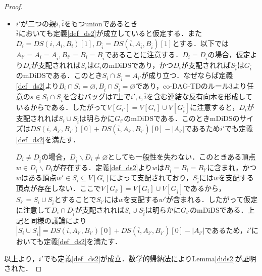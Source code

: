 \documentclass[master]{kuisthesis}		%
\def\|{\verb|}
\theoremstyle{plain}
\theoremstyle{definition}
\begin{document}
\begin{proof}
\begin{itemize}
        \item $i'$が二つの親$i, \overline{i}$をもつunionであるとき \\
        $\overline{i}$においても定義\ref{def_ds2}が成立していると仮定する．また$D_i = DS(i, A_i, B_i)[1], D_{\overline{i}} = DS(\overline{i}, A_{\overline{i}}, B_{\overline{i}})[1]$とする．以下では$A_{i'} = A_{i} = A_{\overline{i}}, B_{i'} = B_{i} = B_{\overline{i}}$であることに注意する．$D_i = D_{\overline{i}}$の場合，仮定より$D_i$が支配されれば$S_i$は$G_i$のmDiDSであり，かつ$D_i$が支配されれば$S_{\overline{i}}$は$G_{\overline{i}}$のmDiDSである．このとき$S_{i} \cap S_{\overline{i}} = A_{i'}$が成り立つ．なぜならば定義\ref{def_ds2}より$B_{i} \cap S_i = \varnothing, B_{\overline{i}} \cap S_{\overline{i}} = \varnothing$であり，co-DAG-TDのルール3より任意の$s \in S_{i} \cap S_{\overline{i}}$を含むバッグは$T$上で$i', i, \overline{i}$を含む連結な反有向木を形成しているからである．したがって$V[G_{i'}] = V[G_i] \cup V[G_{\overline{i}}]$に注意すると，$D_i$が支配されれば$S_i \cup S_{\overline{i}}$は明らかに$G_{i'}$のmDiDSである．このときmDiDSのサイズは$DS(i, A_{i'}, B_{i'})[0] + DS(\overline{i}, A_{i'}, B_{i'})[0] - |A_{i'}|$であるため$i'$でも定義\ref{def_ds2}を満たす．

        $D_i \neq D_{\overline{i}}$の場合，$D_{\overline{i}} \backslash D_i \neq \varnothing$としても一般性を失わない．このときある頂点$w \in D_{\overline{i}} \backslash D_i$が存在する．定義\ref{def_ds2}より$w$は$B_{\overline{i}} = B_{i} = B_{i'}$に含まれ，かつ$w$はある頂点$w' \in S_i\subseteq V[G_i]$によって支配されており，$S_{\overline{i}}$には$w$を支配する頂点が存在しない．ここで$V[G_{i'}] = V[G_i] \cup V[G_{\overline{i}}]$であるから，$S_{i'} = S_i \cup S_{\overline{i}}$とすることで$S_{i'}$には$w$を支配する$w'$が含まれる．したがって仮定に注意して$D_i \cap D_{\overline{i}}$が支配されれば$S_i \cup S_{\overline{i}}$は明らかに$G_{i'}$のmDiDSである．上記と同様の議論により$|S_i \cup S_{\overline{i}}| = DS(i, A_{i'}, B_{i'})[0] + DS(\overline{i}, A_{i'}, B_{i'})[0] - |A_{i'}|$であるため，$i'$においても定義\ref{def_ds2}を満たす．
        
    \end{itemize}
    以上より，$i'$でも定義\ref{def_ds2}が成立．数学的帰納法によりLemma\ref{dids2}が証明された．
\end{proof}






\end{document}
